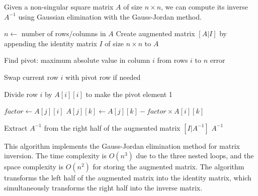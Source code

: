   \begin{algo}
    Given a non-singular square matrix $A$ of size $n \times n$, we can compute its inverse $A^{-1}$ using Gaussian elimination with the Gauss-Jordan method.
    \begin{algorithmic}[1]
       
        \State $n \gets$ number of rows/columns in $A$
        \State Create augmented matrix $[A|I]$ by appending the identity matrix $I$ of size $n \times n$ to $A$
        
         
          \State Find pivot: maximum absolute value in column $i$ from rows $i$ to $n$
            \State \Return error 
          \EndIf
          
          \State Swap current row $i$ with pivot row if needed
          
          \State Divide row $i$ by $A[i][i]$ to make the pivot element 1
          
           
            \State $factor \gets A[j][i]$
             
              \State $A[j][k] \gets A[j][k] - factor \times A[i][k]$
            \EndFor
          \EndFor
        \EndFor
        
        \State Extract $A^{-1}$ from the right half of the augmented matrix $[I|A^{-1}]$
        \State \Return $A^{-1}$
      \EndProcedure
    \end{algorithmic}
    This algorithm implements the Gauss-Jordan elimination method for matrix inversion. The time complexity is $O(n^3)$ due to the three nested loops, and the space complexity is $O(n^2)$ for storing the augmented matrix. The algorithm transforms the left half of the augmented matrix into the identity matrix, which simultaneously transforms the right half into the inverse matrix.
  \end{algo}
  
